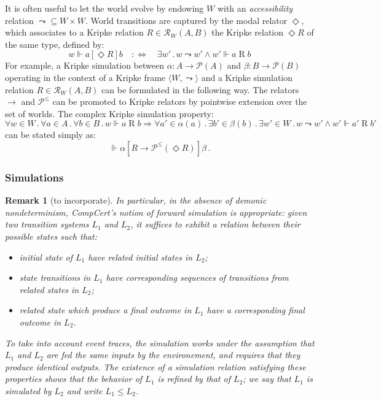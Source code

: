 \documentclass[acmsmall,screen,review,anonymous]{acmart}
\newtheorem{remark}{Remark}
\newcommand{\ifr}[1]{\mathrel{[{#1}]}}
\begin{document}
It is often useful to let the world evolve
by endowing $W$ with an \emph{accessibility} relation
${\leadsto} \subseteq W \times W$.
World transitions are captured by the modal relator $\Diamond$,
which associates to a Kripke relation $R \in \mathcal{R}_W(A, B)$
the Kripke relation $\Diamond R$ of the same type, defined by:
\[
  w \Vdash a \ifr{\Diamond R} b
  \quad:\Leftrightarrow\quad
  \exists w' \mathbin. w \leadsto w' \wedge w' \Vdash a \mathrel{R} b
\]
For example,
a Kripke simulation between $\alpha : A \rightarrow \mathcal{P}(A)$
and $\beta : B \rightarrow \mathcal{P}(B)$
operating in the context of a Kripke frame $\langle W, {\leadsto} \rangle$
and a Kripke simulation relation $R \in \mathcal{R}_W(A, B)$
can be formulated in the following way.
The relators $\rightarrow$ and $\mathcal{P}^\le$
can be promoted to Kripke relators
by pointwise extension over the set of worlds.
The complex Kripke simulation property:
{\small
\[
  \forall w \in W \mathbin.
  \forall a \in A \mathbin.
  \forall b \in B \mathbin.
  w \Vdash a \mathrel{R} b \Rightarrow
  \forall a' \in \alpha(a) \mathbin.
  \exists b' \in \beta(b) \mathbin.
  \exists w' \in W \mathbin.
  w \leadsto w' \wedge w' \Vdash a' \mathrel{R} b'
\]
}
can be stated simply as:
\[
  \Vdash \alpha \ifr{R \rightarrow \mathcal{P}^\le(\Diamond R)} \beta
  \,.
\]


\subsubsection{Simulations} %

\begin{remark}[to incorporate]
In particular,
in the absence of demonic nondeterminism,
CompCert's notion of \emph{forward simulation} is appropriate:
given two transition systems $L_1$ and $L_2$,
it suffices to exhibit a relation between their possible states
such that:
\begin{itemize}
  \item initial state of $L_1$ have related initial states in $L_2$;
  \item state transitions in $L_1$ have corresponding sequences of transitions
    from related states in $L_2$;
  \item related state which produce a final outcome in $L_1$
    have a corresponding final outcome in $L_2$.
\end{itemize}
To take into account event traces,
the simulation works under the assumption that
$L_1$ and $L_2$ are fed the same inputs by the environement,
and requires that they produce identical outputs.
The existence of a simulation relation satisfying these properties
shows that the behavior of $L_1$ is refined by that of $L_2$;
we say that $L_1$ is simulated by $L_2$ and write $L_1 \le L_2$.
\end{remark}
\end{document}
